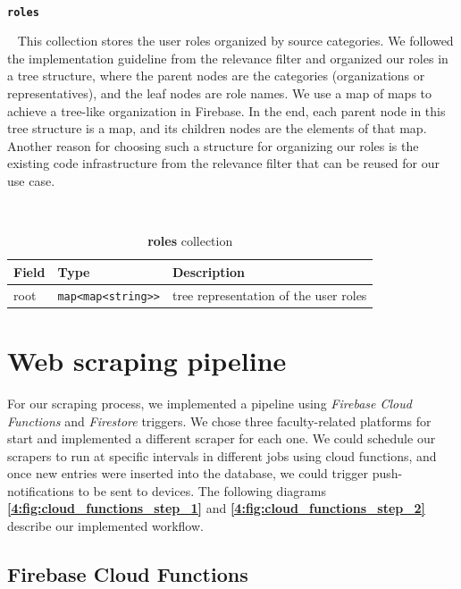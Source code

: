 ~

\faDatabase \hspace{0.1cm} \textbf{\texttt{roles}}

~
This collection stores the user roles organized by source categories. We followed the implementation guideline from the relevance filter and organized our roles in a tree structure, where the parent nodes are the categories (organizations or representatives), and the leaf nodes are role names. We use a map of maps to achieve a tree-like organization in Firebase. In the end, each parent node in this tree structure is a map, and its children nodes are the elements of that map. Another reason for choosing such a structure for organizing our roles is the existing code infrastructure from the relevance filter that can be reused for our use case.

~

\begin{table}[th]\small\linespread{1}
    \centering
    \caption{\textbf{roles} collection}
    \label{5:tab:users}
    \begin{tabular}{| p{3.5cm} | l | p{6.1cm} |}
    \hline
    \textbf{Field} & \textbf{Type} & \textbf{Description} \\
    \hline
    root & \texttt{map<map<string>>} & tree representation of the user roles
    \\
    \hline
    \end{tabular}
\end{table}


\section{Web scraping pipeline} \label{5:pipeline}

For our scraping process, we implemented a pipeline using \textit{Firebase Cloud Functions} and \textit{Firestore} triggers. We chose three faculty-related platforms for start and implemented a different scraper for each one. We could schedule our scrapers to run at specific intervals in different jobs using cloud functions, and once new entries were inserted into the database, we could trigger push-notifications to be sent to devices. The following diagrams \textbf{\ref{4:fig:cloud_functions_step_1}} and \textbf{\ref{4:fig:cloud_functions_step_2}} describe our implemented workflow.

\subsection{Firebase Cloud Functions}

